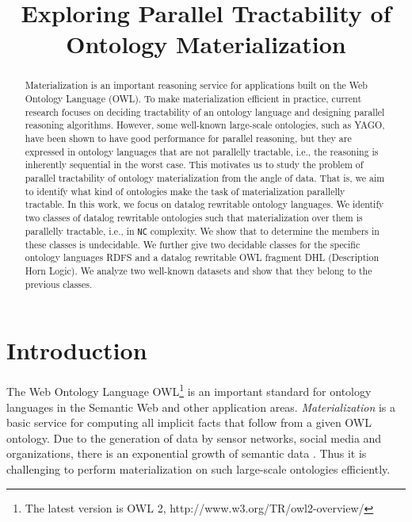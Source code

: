 \documentclass{article}
\title{Exploring Parallel Tractability of Ontology Materialization}
\begin{document}
\maketitle
\newtheorem{lemma}{Lemma}
\newtheorem{theorem}{Theorem}
\newtheorem{problem}{Problem}
\newtheorem{property}{Property}
\newtheorem{definition}{Definition}
\newtheorem{invariant}{Invariant}
\newtheorem{example}{Example}
\newtheorem{remark}{Remark}
\newtheorem{corollary}{Corollary}

\begin{abstract}
Materialization is an important reasoning service for applications built on the Web Ontology Language (OWL). To make materialization efficient in practice, current research focuses on deciding tractability of an ontology language and designing parallel reasoning algorithms. However, some well-known large-scale ontologies, such as YAGO, have been shown to have good performance for parallel reasoning, but they are expressed in ontology languages that are not parallelly tractable, i.e., the reasoning is inherently sequential in the worst case. This motivates us to study the problem of parallel tractability of ontology materialization from the angle of data. That is, we aim to identify what kind of ontologies make the task of materialization parallelly tractable. In this work, we focus on datalog rewritable ontology languages. We identify two classes of datalog rewritable ontologies such that materialization over them is parallelly tractable, i.e., in \texttt{NC} complexity. We show that to determine the members in these classes is undecidable. We further give two decidable classes for the specific ontology languages RDFS and a datalog rewritable OWL fragment DHL (Description Horn Logic). We analyze two well-known datasets and show that they belong to the previous classes.
\end{abstract}



\section{Introduction}
The Web Ontology Language OWL\footnote{The latest version is OWL 2, http://www.w3.org/TR/owl2-overview/} is an important standard for ontology languages in the Semantic Web and other application areas. \emph{Materialization} is a basic service for computing all implicit facts that follow from a given OWL ontology. Due to the generation of data by sensor networks, social media and organizations, there is an exponential growth of semantic data \cite{DBLP:conf/wims/MeuselBP15}. Thus it is challenging to perform materialization on such large-scale ontologies efficiently.
\end{document}
